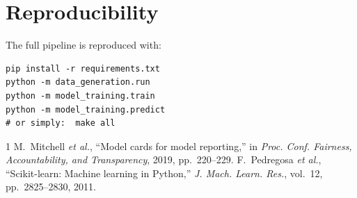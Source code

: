 \documentclass[conference]{IEEEtran}
\begin{document}
\section*{Reproducibility}
The full pipeline is reproduced with:
\begin{lstlisting}
pip install -r requirements.txt
python -m data_generation.run
python -m model_training.train
python -m model_training.predict
# or simply:  make all
\end{lstlisting}

\begin{thebibliography}{1}
M.~Mitchell \emph{et al.}, ``Model cards for model reporting,''
in \emph{Proc. Conf. Fairness, Accountability, and Transparency}, 2019,
pp.~220--229.
F.~Pedregosa \emph{et al.}, ``Scikit-learn: Machine learning in Python,''
\emph{J. Mach. Learn. Res.}, vol.~12, pp.~2825--2830, 2011.
\end{thebibliography}
\end{document}
